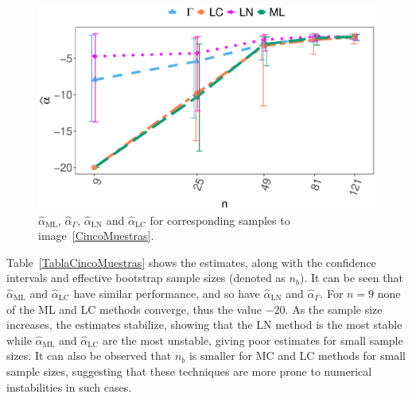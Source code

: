 \documentclass[twocolumn]{svjour3}
\begin{document}
\begin{figure}[hbt]
	\centering
	\includegraphics[width=\linewidth]{../../../Figures/PaperTesis/AlfaVsTamCincoMuestrasCorregido_v2.eps}
	\caption{ $\widehat{\alpha}_{\text{{ML}}}$, $\widehat{\alpha}_{\Gamma}$, $\widehat{\alpha}_{\text{{LN}}}$ and $\widehat{\alpha}_{\text{{LC}}}$ for corresponding samples to image~\ref{CincoMuestras}.}\label{AlfaVsTamCincoMuestras}
\end{figure}

Table~\ref{TablaCincoMuestras} shows the estimates, along with the confidence intervals and effective bootstrap sample sizes (denoted as $n_b$).
It can be seen that $\widehat{\alpha}_{\text{{ML}}}$ and $\widehat{\alpha}_{\text{{LC}}}$ have similar performance, and so have $\widehat{\alpha}_{\text{{LN}}}$ and $\widehat{\alpha}_{\Gamma}$. 
For $n= 9$ none of the ML and LC methods converge, thus the value $-20$. 
As the sample size increases, the estimates stabilize, showing that the LN method is the most stable while $\widehat{\alpha}_{\text{{ML}}}$ and $\widehat{\alpha}_{\text{{LC}}}$ are the most unstable, giving poor estimates for small sample sizes.
It can also be observed that $n_b$ is smaller for MC and LC methods for small sample sizes, suggesting that these techniques are more prone to numerical instabilities in such cases.
\end{document}
